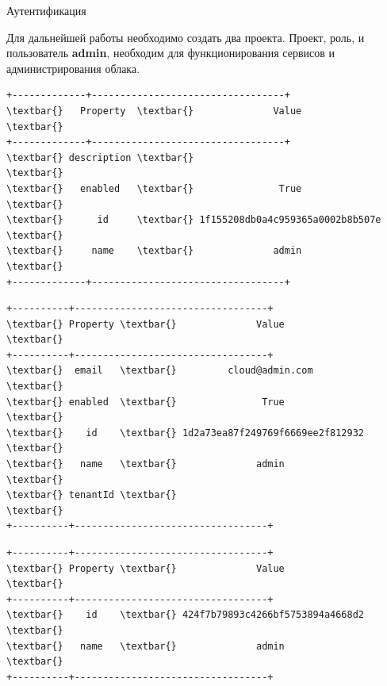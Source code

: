 \documentclass[letterpaper,10pt,russian]{sphinxmanual}
\begin{document}
Аутентификация



Для дальнейшей работы необходимо создать два проекта. Проект, роль, и пользователь \textbf{admin}, необходим для функционирования сервисов и администрирования облака.


\begin{Verbatim}[commandchars=\\\{\}]
+-------------+----------------------------------+
\textbar{}   Property  \textbar{}              Value               \textbar{}
+-------------+----------------------------------+
\textbar{} description \textbar{}                                  \textbar{}
\textbar{}   enabled   \textbar{}               True               \textbar{}
\textbar{}      id     \textbar{} 1f155208db0a4c959365a0002b8b507e \textbar{}
\textbar{}     name    \textbar{}              admin               \textbar{}
+-------------+----------------------------------+
\end{Verbatim}


\begin{Verbatim}[commandchars=\\\{\}]
+----------+----------------------------------+
\textbar{} Property \textbar{}              Value               \textbar{}
+----------+----------------------------------+
\textbar{}  email   \textbar{}         cloud@admin.com          \textbar{}
\textbar{} enabled  \textbar{}               True               \textbar{}
\textbar{}    id    \textbar{} 1d2a73ea87f249769f6669ee2f812932 \textbar{}
\textbar{}   name   \textbar{}              admin               \textbar{}
\textbar{} tenantId \textbar{}                                  \textbar{}
+----------+----------------------------------+
\end{Verbatim}


\begin{Verbatim}[commandchars=\\\{\}]
+----------+----------------------------------+
\textbar{} Property \textbar{}              Value               \textbar{}
+----------+----------------------------------+
\textbar{}    id    \textbar{} 424f7b79893c4266bf5753894a4668d2 \textbar{}
\textbar{}   name   \textbar{}              admin               \textbar{}
+----------+----------------------------------+
\end{Verbatim}
\end{document}
